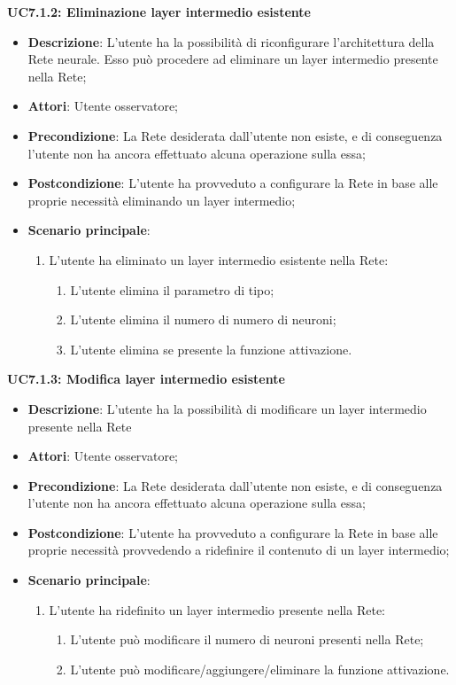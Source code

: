 \textbf{UC7.1.2: Eliminazione layer intermedio esistente}
\label{UC7.1.2: Eliminazione layer intermedio esistente}
\noindent
\begin{itemize}
\item \textbf{Descrizione}: L'utente ha la possibilit\`a di riconfigurare l'architettura della Rete neurale. Esso pu\`o procedere ad eliminare un layer intermedio presente nella Rete;
\item \textbf{Attori}: Utente osservatore;
\item \textbf{Precondizione}: La Rete desiderata dall'utente non esiste, e di conseguenza l'utente non ha ancora effettuato alcuna operazione sulla essa;
\item \textbf{Postcondizione}: L'utente ha provveduto a configurare la Rete in base alle proprie necessit\`a eliminando un layer intermedio;
\item \textbf{Scenario principale}:
\begin{enumerate}
\item L'utente ha eliminato un layer intermedio esistente nella Rete:
\begin{enumerate}
\item L'utente elimina il parametro di tipo;
\item L'utente elimina il numero di numero di neuroni;
\item L'utente elimina se presente la funzione attivazione.
\end{enumerate}
\end{enumerate}
\end{itemize}

\textbf{UC7.1.3: Modifica layer intermedio esistente}
\label{UC7.1.3: Modifica layer intermedio esistente}
\noindent
\begin{itemize}
\item \textbf{Descrizione}: L'utente ha la possibilit\`a di modificare un layer intermedio presente nella Rete
\item \textbf{Attori}: Utente osservatore;
\item \textbf{Precondizione}: La Rete desiderata dall'utente non esiste, e di conseguenza l'utente non ha ancora effettuato alcuna operazione sulla essa;
\item \textbf{Postcondizione}: L'utente ha provveduto a configurare la Rete in base alle proprie necessit\`a 
provvedendo a ridefinire il contenuto di un layer intermedio;
\item \textbf{Scenario principale}:
\begin{enumerate}
\item L'utente ha ridefinito un layer intermedio presente nella Rete:
\begin{enumerate}
\item L'utente pu\`o modificare il numero di neuroni presenti nella Rete;
\item L'utente pu\`o modificare/aggiungere/eliminare la funzione attivazione.
\end{enumerate}
\end{enumerate}
\end{itemize}


